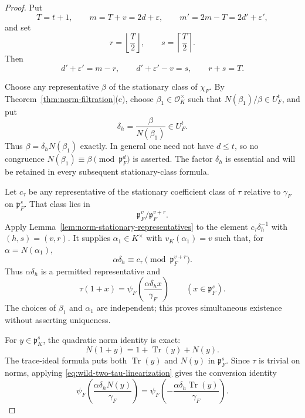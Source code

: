 \documentclass[11pt]{amsart}
\theoremstyle{definition}
\theoremstyle{remark}
\newcommand{\cO}{\mathcal O}
\newcommand{\p}{\mathfrak p}
\newcommand{\Tr}{\operatorname{Tr}}
\begin{document}
\begin{proof}
Put
\[
 T=t+1,\qquad m=T+v=2d+\varepsilon,
 \qquad m'=2m-T=2d'+\varepsilon',
\]
and set
\[
 r=\left\lfloor\frac T2\right\rfloor,
 \qquad s=\left\lceil\frac T2\right\rceil.
\]
Then
\begin{equation}\label{eq:wild-two-depth-identities}
 d'+\varepsilon'=m-r,
 \qquad d'+\varepsilon'-v=s,
 \qquad r+s=T.
\end{equation}

Choose any representative $\beta$ of the stationary class of $\chi_F$.
By Theorem~\ref{thm:norm-filtration}(c), choose
$\beta_1\in\cO_K^\times$ such that
$N(\beta_1)/\beta\in U_F^t$, and put
\[
 \delta_h=\frac{\beta}{N(\beta_1)}\in U_F^t.
\]
Thus $\beta=\delta_hN(\beta_1)$ exactly.  In general one need not have
$d\le t$, so no congruence
$N(\beta_1)\equiv\beta\pmod{\p_F^d}$ is asserted.  The factor
$\delta_h$ is essential and will be retained in every subsequent
stationary-class formula.

Let $c_\tau$ be any representative of the stationary coefficient class
of $\tau$ relative to $\gamma_F$ on $\p_F^s$.  That class lies in
\[
 \p_F^v/\p_F^{v+r}.
\]
Apply Lemma~\ref{lem:norm-stationary-representatives} to the element
$c_\tau\delta_h^{-1}$ with $(h,s)=(v,r)$.  It supplies
$\alpha_1\in K^\times$ with $v_K(\alpha_1)=v$ such that, for
$\alpha=N(\alpha_1)$,
\[
 \alpha\delta_h\equiv c_\tau\pmod{\p_F^{v+r}}.
\]
Thus $\alpha\delta_h$ is a permitted representative and
\begin{equation}\label{eq:wild-two-tau-linearization}
 \tau(1+x)=
 \psi_F\!\left(\frac{\alpha\delta_hx}{\gamma_F}\right)
 \qquad(x\in\p_F^s).
\end{equation}
The choices of $\beta_1$ and $\alpha_1$ are independent; this proves
simultaneous existence without asserting uniqueness.

For $y\in\p_K^s$, the quadratic norm identity is exact:
\[
 N(1+y)=1+\Tr(y)+N(y).
\]
The trace-ideal formula puts both $\Tr(y)$ and $N(y)$ in $\p_F^s$.
Since $\tau$ is trivial on norms, applying
\eqref{eq:wild-two-tau-linearization} gives the conversion identity
\begin{equation}\label{eq:wild-two-conversion}
 \psi_F\!\left(\frac{\alpha\delta_hN(y)}{\gamma_F}\right)
 =\psi_F\!\left(-\frac{\alpha\delta_h\Tr(y)}{\gamma_F}\right).
\end{equation}


\end{proof}
\end{document}
